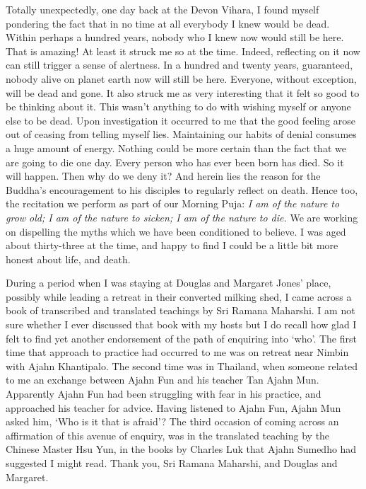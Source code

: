 Totally unexpectedly, one day back at the Devon Vihara, I found myself
pondering the fact that in no time at all everybody I knew would be
dead. Within perhaps a hundred years, nobody who I knew now would still
be here. That is amazing! At least it struck me so at the time. Indeed,
reflecting on it now can still trigger a sense of alertness. In a
hundred and twenty years, guaranteed, nobody alive on planet earth now
will still be here. Everyone, without exception, will be dead and gone.
It also struck me as very interesting that it felt so good to be
thinking about it. This wasn't anything to do with wishing myself or
anyone else to be dead. Upon investigation it occurred to me that the
good feeling arose out of ceasing from telling myself lies. Maintaining
our habits of denial consumes a huge amount of energy. Nothing could be
more certain than the fact that we are going to die one day. Every
person who has ever been born has died. So it will happen. Then why do
we deny it? And herein lies the reason for the Buddha's encouragement to
his disciples to regularly reflect on death\cite{death}.
Hence too, the recitation we perform as
part of our Morning Puja: \emph{I am of the nature to grow old; I am of
the nature to sicken; I am of the nature to die.} We are working on
dispelling the myths which we have been conditioned to believe. I was
aged about thirty-three at the time, and happy to find I could be a
little bit more honest about life, and death.

During a period when I was staying at Douglas and Margaret Jones' place,
possibly while leading a retreat in their converted milking shed, I came
across a book of transcribed and translated teachings by Sri Ramana Maharshi\cite{maharshi}.
I am not sure whether I ever discussed that
book with my hosts but I do recall how glad I felt to find yet another
endorsement of the path of enquiring into `who'. The first time that
approach to practice had occurred to me was on retreat near Nimbin with
Ajahn Khantipalo. The second time was in Thailand, when someone related
to me an exchange between Ajahn Fun and his teacher Tan Ajahn Mun.
Apparently Ajahn Fun had been struggling with fear in his practice, and
approached his teacher for advice. Having listened to Ajahn Fun, Ajahn
Mun asked him, `Who is it that is afraid'? The third occasion of coming
across an affirmation of this avenue of enquiry, was in the translated
teaching by the Chinese Master Hsu Yun, in the books by Charles Luk that
Ajahn Sumedho had suggested I might read. Thank you, Sri Ramana
Maharshi, and Douglas and Margaret.

